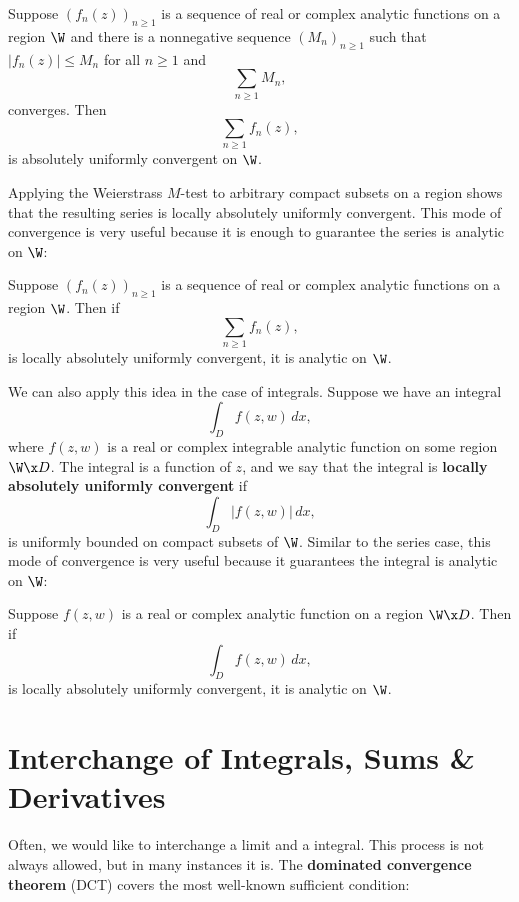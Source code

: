    \begin{theorem}
      Suppose $(f_{n}(z))_{n \ge 1}$ is a sequence of real or complex analytic functions on a region $\W$ and there is a nonnegative sequence $(M_{n})_{n \ge 1}$ such that $|f_{n}(z)| \le M_{n}$ for all $n \ge 1$ and
      \[
        \sum_{n \ge 1}M_{n},
      \]
      converges. Then
      \[
        \sum_{n \ge 1}f_{n}(z),
      \]
      is absolutely uniformly convergent on $\W$.
    \end{theorem}

    Applying the Weierstrass $M$-test to arbitrary compact subsets on a region shows that the resulting series is locally absolutely uniformly convergent. This mode of convergence is very useful because it is enough to guarantee the series is analytic on $\W$:

    \begin{theorem}
      Suppose $(f_{n}(z))_{n \ge 1}$ is a sequence of real or complex analytic functions on a region $\W$. Then if
      \[
        \sum_{n \ge 1}f_{n}(z),
      \]
      is locally absolutely uniformly convergent, it is analytic on $\W$.
    \end{theorem}

    We can also apply this idea in the case of integrals. Suppose we have an integral
    \[
      \int_{D}f(z,w)\,dx,
    \]
    where $f(z,w)$ is a real or complex integrable analytic function on some region $\W \x D$. The integral is a function of $z$, and we say that the integral is \textbf{locally absolutely uniformly convergent} if
    \[
      \int_{D}|f(z,w)|\,dx,
    \]
    is uniformly bounded on compact subsets of $\W$. Similar to the series case, this mode of convergence is very useful because it guarantees the integral is analytic on $\W$:

    \begin{theorem}\label{thm:analytic_integral}
      Suppose $f(z,w)$ is a real or complex analytic function on a region $\W \x D$. Then if
      \[
        \int_{D}f(z,w)\,dx,
      \]
      is locally absolutely uniformly convergent, it is analytic on $\W$.
    \end{theorem}
  \section{Interchange of Integrals, Sums \& Derivatives}
    Often, we would like to interchange a limit and a integral. This process is not always allowed, but in many instances it is. The \textbf{dominated convergence theorem} (DCT) covers the most well-known sufficient condition:

